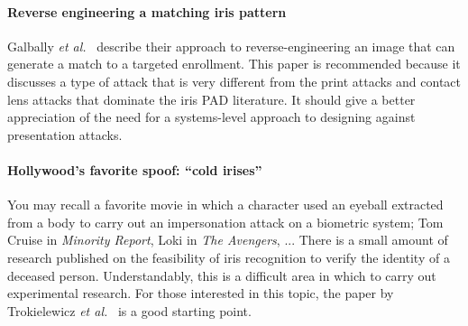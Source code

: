 \documentclass[format=acmsmall, review=false, timestamp=false]{acmart}
\newcommand{\etal}{{\it et al.}~}
\begin{document}
\paragraph{Reverse engineering a matching iris pattern}

Galbally \etal \cite{Galbally_Handbook_2016} describe their approach to reverse-engineering an image that can generate a match to a targeted enrollment. This paper is recommended because it discusses a type of attack that is very different from the print attacks and contact lens attacks that dominate the iris PAD literature. It should give a better appreciation of the need for a systems-level approach to designing against presentation attacks.

\paragraph{Hollywood's favorite spoof: ``cold irises''}

You may recall a favorite movie in which a character used an eyeball extracted from a body to carry out an impersonation attack on a biometric system; Tom Cruise in {\it Minority Report}, Loki in {\it The Avengers}, ... There is a small amount of research published on the feasibility of iris recognition to verify the identity of a deceased person. Understandably, this is a difficult area in which to carry out experimental research. For those interested in this topic, the paper by Trokielewicz \etal \cite{Trokielewicz_BTAS_2016} is a good starting point.
\end{document}
